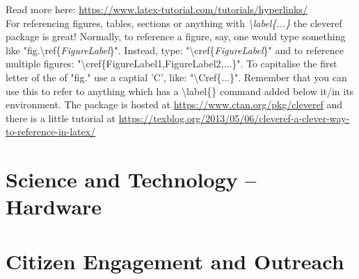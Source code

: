 \documentclass[11pt,a4paper,fleqn, oneside]{book} %
\begin{document}
Read more here: \url{https://www.latex-tutorial.com/tutorials/hyperlinks/}\\

For referencing figures, tables, sections or anything with \textit{\textbackslash{}label\{...\}} the cleveref package is great! Normally, to reference a figure, say, one would type something like "fig.\textbackslash{}ref\{\textit{FigureLabel}\}". Instead, type: "\textbackslash{}cref\{\textit{FigureLabel}\}" and to reference multiple figures: "\textbackslash{}cref\{FigureLabel1,FigureLabel2,...\}". To capitalise the first letter of the of "fig." use a captial 'C', like: "\textbackslash{Cref\{...\}}". Remember that you can use this to refer to anything which has a \textbackslash{label\{\}} command added below it/in its environment. The package is hosted at \url{https://www.ctan.org/pkg/cleveref} and there is a little tutorial at \url{https://texblog.org/2013/05/06/cleveref-a-clever-way-to-reference-in-latex/}

\fi
    \vspace{-0.5cm}






\chapter{Science and Technology -- Hardware}
  \setcounter{page}{9}

\vspace{-1.5cm}

\clearpage







\chapter{Citizen Engagement and Outreach}
\end{document}
